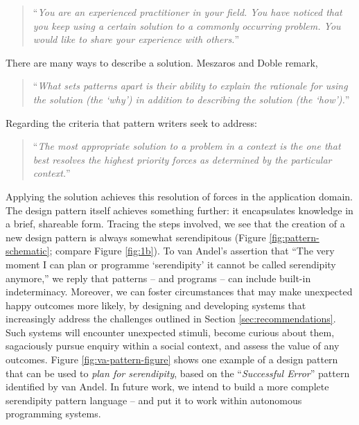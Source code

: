 \begin{quote}
\noindent ``\emph{You are an experienced practitioner in your field.  You
have noticed that you keep using a certain solution to a commonly
occurring problem.  You would like to share your experience with
others.}''
\end{quote}

\noindent There are many ways to describe a solution. Meszaros and Doble remark,
\begin{quote}
\noindent ``\emph{What sets patterns apart is their ability to explain the
rationale for using the solution (the `why') in addition to describing
the solution (the `how').}''
\end{quote}
Regarding the criteria that pattern writers seek to address: 
\begin{quote}
\noindent ``\emph{The most appropriate solution to a problem in a context is
the one that best resolves the highest priority forces as determined
by the particular context.}''
\end{quote}

%
%
Applying the solution achieves this resolution of forces in the
application domain.
The design pattern itself achieves something further: it encapsulates
knowledge in a brief, shareable form.  Tracing the steps involved, we
see that the creation of a new design pattern is always somewhat
serendipitous (Figure \ref{fig:pattern-schematic}; compare Figure
\ref{fig:1b}).
To van Andel's assertion that ``The very moment I can plan or
programme `serendipity' it cannot be called serendipity anymore,'' we
reply that patterns -- and programs -- can include built-in
indeterminacy.  Moreover, we can foster circumstances that may make
unexpected happy outcomes more likely, by designing and developing
systems that increasingly address the challenges outlined in Section
\ref{sec:recommendations}.  Such systems will encounter unexpected
stimuli, become curious about them, sagaciously pursue enquiry
within a social context, and assess the value of any outcomes.
%
Figure \ref{fig:va-pattern-figure} shows one example of a design
pattern that can be used to \emph{plan for serendipity}, based on the
``\emph{Successful Error}'' pattern identified by van Andel.  In
future work, we intend to build a more complete serendipity pattern
language -- and put it to work within autonomous programming systems.

